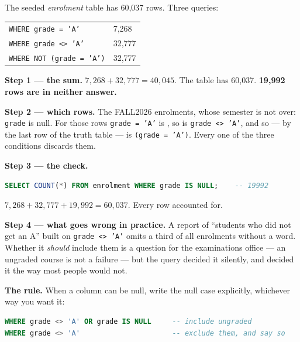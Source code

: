 \begin{worked}
The seeded \textit{enrolment} table has 60{,}037 rows. Three queries:

\medskip
\begin{tabular}{@{}L{7.2cm}R{2.6cm}@{}}
\texttt{WHERE grade = 'A'}       & 7{,}268 \\
\texttt{WHERE grade <> 'A'}      & 32{,}777 \\
\texttt{WHERE NOT (grade = 'A')} & 32{,}777 \\
\end{tabular}

\medskip
\textbf{Step 1 --- the sum.} $7{,}268 + 32{,}777 = 40{,}045$. The table has
60{,}037. \textbf{19{,}992 rows are in neither answer.}

\medskip
\textbf{Step 2 --- which rows.} The FALL2026 enrolments, whose semester is not
over: \texttt{grade} is null. For those rows \texttt{grade = 'A'} is
\unk{}, so is \texttt{grade <> 'A'}, and so --- by the last row of
the truth table --- is  \texttt{(grade = 'A')}. Every one of the
three conditions discards them.

\medskip
\textbf{Step 3 --- the check.}
\begin{lstlisting}[language=sql]
SELECT COUNT(*) FROM enrolment WHERE grade IS NULL;    -- 19992
\end{lstlisting}
$7{,}268 + 32{,}777 + 19{,}992 = 60{,}037$. Every row accounted for.

\medskip
\textbf{Step 4 --- what goes wrong in practice.} A report of ``students who
did not get an A'' built on \texttt{grade <> 'A'} omits a third of all
enrolments without a word. Whether it \emph{should} include them is a question
for the examinations office --- an ungraded course is not a failure --- but
the query decided it silently, and decided it the way most people would not.

\medskip
\textbf{The rule.} When a column can be null, write the null case
explicitly, whichever way you want it:
\begin{lstlisting}[language=sql]
WHERE grade <> 'A' OR grade IS NULL     -- include ungraded
WHERE grade <> 'A'                      -- exclude them, and say so
\end{lstlisting}
\end{worked}

